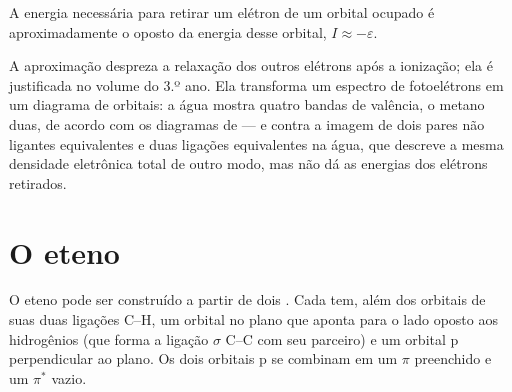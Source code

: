 \begin{proposition}\label{prop:b2:fragment-orbitals:koopmans}
A energia necessária para retirar um elétron de um orbital ocupado é
aproximadamente o oposto da energia desse orbital, $I \approx -\varepsilon$.
\end{proposition}

\admitted

A aproximação despreza a relaxação dos outros elétrons após a ionização; ela
é justificada no volume do 3.º ano. Ela transforma um espectro de fotoelétrons
em um diagrama de orbitais: a água mostra quatro bandas de valência, o metano
duas, de acordo com os diagramas de  --- e contra a imagem de dois
pares não ligantes equivalentes e duas ligações equivalentes na água, que
descreve a mesma densidade eletrônica total de outro modo, mas não dá as
energias dos elétrons retirados.

\section{O eteno}

O eteno pode ser construído a partir de dois  . Cada 
tem, além dos orbitais de suas duas ligações C--H, um orbital no plano que
aponta para o lado oposto aos hidrogênios (que forma a ligação $\sigma$ C--C
com seu parceiro) e um orbital p perpendicular ao plano. Os dois orbitais p se
combinam em um $\pi$ preenchido e um $\pi^*$ vazio.

